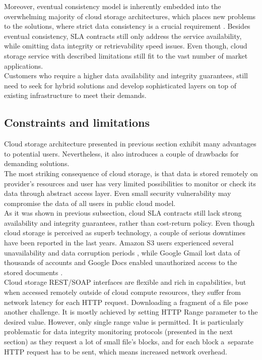Moreover, eventual consistency model is inherently embedded into the
overwhelming majority of cloud storage architectures, which places new problems
to the solutions, where strict data consistency is a crucial requirement
\cite{metastorage, cloud-federation}. Besides eventual consistency, SLA
contracts still only address the service availability, while omitting data
integrity or retrievability speed issues. Even though, cloud storage service
with described limitations still fit to the vast number of market 
applications.\\

Customers who require a higher data availability and integrity guarantees,
still need to seek for hybrid solutions and develop sophisticated layers on
top of existing infrastructure to meet their demands.

		\subsection{Constraints and limitations}
Cloud storage architecture presented in previous section exhibit many
advantages to potential users. Nevertheless, it also introduces a couple of
drawbacks for demanding solutions.\\

The most striking consequence of cloud storage, is that data is stored remotely
on provider's resources and user has very limited possibilities to monitor or
check its data through abstract access layer. Even small security vulnerability
may compromise the data of all users in public cloud model.\\

As it was shown in previous subsection, cloud SLA contracts still lack strong
availability and integrity guarantees, rather than cost-return policy. Even
though cloud storage is perceived as superb technology, a couple of serious
downtimes have been reported in the last years. Amazon S3 users experienced
several unavailability and data corruption periods \cite{amazon-downtimes},
while Google Gmail lost data of thousands of accounts \cite{gmail-downtime} and
Google Docs enabled unauthorized access to the stored documents 
\cite{docs-downtime}.\\

Cloud storage REST/SOAP interfaces are flexible and rich in capabilities, but
when accessed remotely outside of cloud compute resources, they suffer from
network latency for each HTTP request. Downloading a fragment of a file pose
another challenge. It is mostly achieved by setting HTTP Range parameter to the
desired value. However, only single range value is permitted. It is particularly
problematic for data integrity monitoring protocols (presented in the next
section) as they request a lot of small file's blocks, and for each block 
a~separate HTTP request has to be sent, which means increased network
overhead.\\

